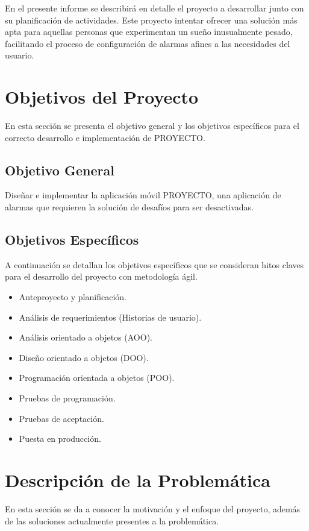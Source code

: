 \documentclass[letterpaper, 10pt]{article}
\newcommand{\nomproyecto}{PROYECTO}
\begin{document}
En el presente informe se describirá en detalle el proyecto a desarrollar junto con su planificación de actividades.
\newline
Este proyecto intentar ofrecer una solución más apta para aquellas personas que experimentan un sueño inusualmente pesado, facilitando el proceso de configuración de alarmas afines a las necesidades del usuario.

\section{Objetivos del Proyecto}
En esta sección se presenta el objetivo general y los objetivos específicos para el correcto desarrollo e implementación de \nomproyecto.
\subsection{Objetivo General}
Diseñar e implementar la aplicación móvil \nomproyecto, una aplicación de alarmas que requieren la solución de desafíos para ser desactivadas.
\subsection{Objetivos Específicos}
A continuación se detallan los objetivos específicos que se consideran hitos claves para el desarrollo del proyecto con metodología ágil.
\begin{itemize}
	\item Anteproyecto y planificación.
	\item Análisis de requerimientos (Historias de usuario).
	\item Análisis orientado a objetos (AOO).
	\item Diseño orientado a objetos (DOO).
	\item Programación orientada a objetos (POO).
	\item Pruebas de programación.
	\item Pruebas de aceptación.
	\item Puesta en producción.
\end{itemize}

\section{Descripción de la Problemática}
En esta sección se da a conocer la motivación y el enfoque del proyecto, además de las soluciones actualmente presentes a la problemática.
\end{document}
